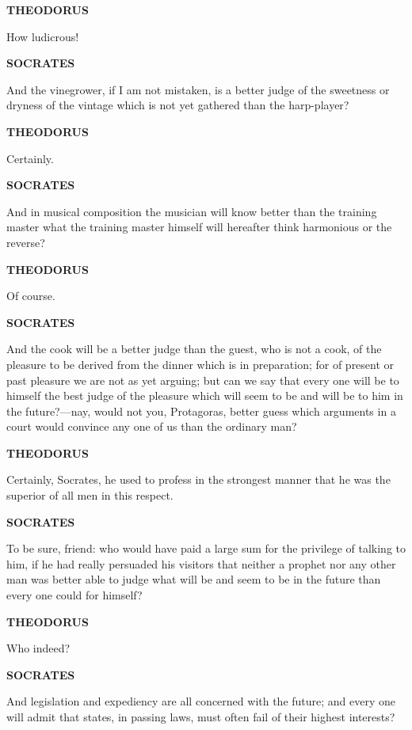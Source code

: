 \documentclass[11pt,letter]{article}
\begin{document}
\par \textbf{THEODORUS}
\par   How ludicrous!

\par \textbf{SOCRATES}
\par   And the vinegrower, if I am not mistaken, is a better judge of the sweetness or dryness of the vintage which is not yet gathered than the harp-player?

\par \textbf{THEODORUS}
\par   Certainly.

\par \textbf{SOCRATES}
\par   And in musical composition the musician will know better than the training master what the training master himself will hereafter think harmonious or the reverse?

\par \textbf{THEODORUS}
\par   Of course.

\par \textbf{SOCRATES}
\par   And the cook will be a better judge than the guest, who is not a cook, of the pleasure to be derived from the dinner which is in preparation; for of present or past pleasure we are not as yet arguing; but can we say that every one will be to himself the best judge of the pleasure which will seem to be and will be to him in the future?—nay, would not you, Protagoras, better guess which arguments in a court would convince any one of us than the ordinary man?

\par \textbf{THEODORUS}
\par   Certainly, Socrates, he used to profess in the strongest manner that he was the superior of all men in this respect.

\par \textbf{SOCRATES}
\par   To be sure, friend:  who would have paid a large sum for the privilege of talking to him, if he had really persuaded his visitors that neither a prophet nor any other man was better able to judge what will be and seem to be in the future than every one could for himself?

\par \textbf{THEODORUS}
\par   Who indeed?

\par \textbf{SOCRATES}
\par   And legislation and expediency are all concerned with the future; and every one will admit that states, in passing laws, must often fail of their highest interests?
\end{document}
